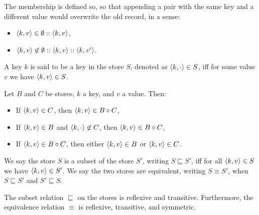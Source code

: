 The membership is defined so, so that appending a pair with the same key and a different value would overwrite the old record, in a sense:
\begin{itemize}
    \item $\langle k, v \rangle \in \emptyset :: \langle k, v \rangle$,
    \item $\langle k, v \rangle \not\in \emptyset :: \langle k, v \rangle :: \left\langle k, v' \right\rangle$.
\end{itemize}

\begin{definition}
A key $k$ is said to be a key in the store $S$, denoted as $\left\langle k, \cdot \right\rangle \in S$, iff for some value $v$ we have $\langle k, v \rangle \in S$.
\end{definition}

\begin{lemma}
Let $B$ and $C$ be stores, $k$ a key, and $v$ a value. Then:
\begin{itemize}
    \item If $\langle k, v \rangle \in C$, then $\langle k, v \rangle \in B \circ C$,
    \item If $\langle k, v \rangle \in B$ and $\left\langle k, \cdot \right\rangle \not\in C$, then $\langle k, v \rangle \in B \circ C$,
    \item If $\langle k, v \rangle \in B \circ C$, then either $\langle k, v \rangle \in B$ or $\langle k, v \rangle \in C$.
\end{itemize}
\end{lemma}

\begin{definition}[Equivalence]
We say the store $S$ is a subset of the store $S'$, writing $S \sqsubseteq S'$, iff for all $\langle k, v \rangle \in S$ we have $\langle k, v \rangle \in S'$. We say the two stores are equivalent, writing $S \equiv S'$, when $S \sqsubseteq S'$ and $S' \sqsubseteq S$.
\end{definition}

\begin{lemma}
The subset relation $\sqsubseteq$ on the stores is reflexive and transitive. Furthermore, the equivalence relation $\equiv$ is reflexive, transitive, and symmetric.
\end{lemma}